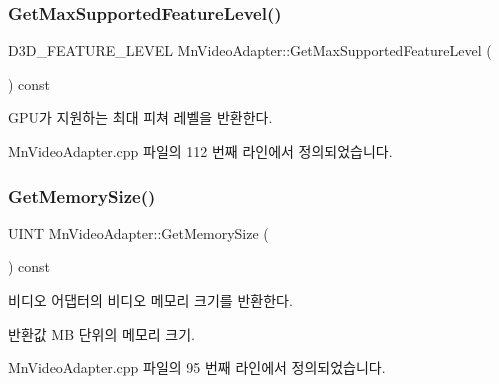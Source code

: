 \mbox{\label{class_m_n_l_1_1_mn_video_adapter_a1aa867ebf8d8d7a5ac856c4bf390841c}} 
\subsubsection{\texorpdfstring{Get\+Max\+Supported\+Feature\+Level()}{GetMaxSupportedFeatureLevel()}}
{\footnotesize\ttfamily D3\+D\+\_\+\+F\+E\+A\+T\+U\+R\+E\+\_\+\+L\+E\+V\+EL Mn\+Video\+Adapter\+::\+Get\+Max\+Supported\+Feature\+Level (\begin{DoxyParamCaption}{ }\end{DoxyParamCaption}) const}



G\+P\+U가 지원하는 최대 피쳐 레벨을 반환한다. 



Mn\+Video\+Adapter.\+cpp 파일의 112 번째 라인에서 정의되었습니다.

\mbox{\label{class_m_n_l_1_1_mn_video_adapter_ab808ef75e5741aafa34e295df44fa734}} 
\subsubsection{\texorpdfstring{Get\+Memory\+Size()}{GetMemorySize()}}
{\footnotesize\ttfamily U\+I\+NT Mn\+Video\+Adapter\+::\+Get\+Memory\+Size (\begin{DoxyParamCaption}{ }\end{DoxyParamCaption}) const}



비디오 어댑터의 비디오 메모리 크기를 반환한다. 

\begin{DoxyReturn}{반환값}
MB 단위의 메모리 크기. 
\end{DoxyReturn}


Mn\+Video\+Adapter.\+cpp 파일의 95 번째 라인에서 정의되었습니다.

